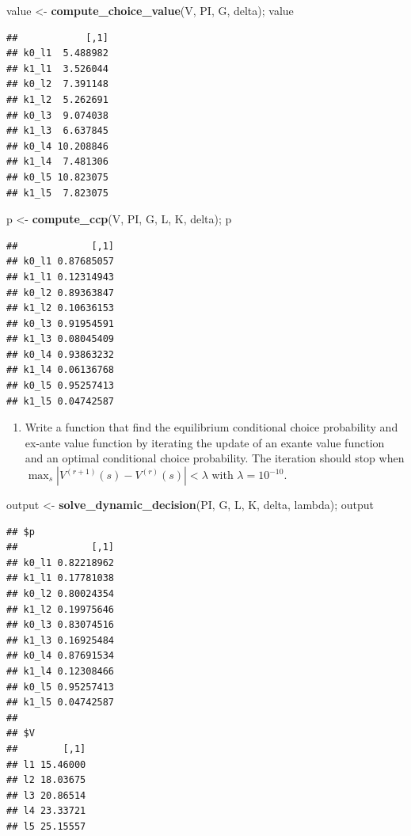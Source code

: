 \documentclass[]{book}
\newenvironment{Shaded}{\begin{snugshade}}{\end{snugshade}}
\newcommand{\KeywordTok}[1]{\textcolor[rgb]{0.13,0.29,0.53}{\textbf{#1}}}
\newcommand{\StringTok}[1]{\textcolor[rgb]{0.31,0.60,0.02}{#1}}
\newcommand{\NormalTok}[1]{#1}
\providecommand{\tightlist}{%
  \setlength{\itemsep}{0pt}\setlength{\parskip}{0pt}}
\begin{document}
\begin{Shaded}
\begin{Highlighting}[]
\NormalTok{value <-}\StringTok{ }\KeywordTok{compute_choice_value}\NormalTok{(V, PI, G, delta); value}
\end{Highlighting}
\end{Shaded}

\begin{verbatim}
##            [,1]
## k0_l1  5.488982
## k1_l1  3.526044
## k0_l2  7.391148
## k1_l2  5.262691
## k0_l3  9.074038
## k1_l3  6.637845
## k0_l4 10.208846
## k1_l4  7.481306
## k0_l5 10.823075
## k1_l5  7.823075
\end{verbatim}

\begin{Shaded}
\begin{Highlighting}[]
\NormalTok{p <-}\StringTok{ }\KeywordTok{compute_ccp}\NormalTok{(V, PI, G, L, K, delta); p}
\end{Highlighting}
\end{Shaded}

\begin{verbatim}
##             [,1]
## k0_l1 0.87685057
## k1_l1 0.12314943
## k0_l2 0.89363847
## k1_l2 0.10636153
## k0_l3 0.91954591
## k1_l3 0.08045409
## k0_l4 0.93863232
## k1_l4 0.06136768
## k0_l5 0.95257413
## k1_l5 0.04742587
\end{verbatim}

\begin{enumerate}
\def\labelenumi{\arabic{enumi}.}
\setcounter{enumi}{4}
\tightlist
\item
  Write a function that find the equilibrium conditional choice
  probability and ex-ante value function by iterating the update of an
  exante value function and an optimal conditional choice probability.
  The iteration should stop when
  \(\max_s|V^{(r + 1)}(s) - V^{(r)}(s)| < \lambda\) with
  \(\lambda = 10^{-10}\).
\end{enumerate}

\begin{Shaded}
\begin{Highlighting}[]
\NormalTok{output <-}\StringTok{ }\KeywordTok{solve_dynamic_decision}\NormalTok{(PI, G, L, K, delta, lambda); output}
\end{Highlighting}
\end{Shaded}

\begin{verbatim}
## $p
##             [,1]
## k0_l1 0.82218962
## k1_l1 0.17781038
## k0_l2 0.80024354
## k1_l2 0.19975646
## k0_l3 0.83074516
## k1_l3 0.16925484
## k0_l4 0.87691534
## k1_l4 0.12308466
## k0_l5 0.95257413
## k1_l5 0.04742587
## 
## $V
##        [,1]
## l1 15.46000
## l2 18.03675
## l3 20.86514
## l4 23.33721
## l5 25.15557
\end{verbatim}
\end{document}
